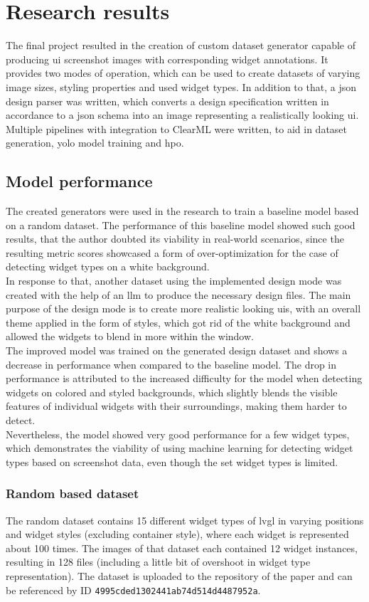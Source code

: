 \documentclass[Bachelor, BIC, english, fhCitStyle, IEEE]{BASE/twbook} %
\def\code#1{\texttt{#1}}
\begin{document}
\chapter{Research results}
The final project resulted in the creation of custom dataset generator capable of producing \ac{ui} screenshot images with corresponding widget annotations. It provides two modes of operation, which can be used to create datasets of varying image sizes, styling properties and used widget types.
In addition to that, a \ac{json} design parser was written, which converts a design specification written in accordance to a \ac{json} schema into an image representing a realistically looking \ac{ui}.\\
Multiple pipelines with integration to ClearML were written, to aid in dataset generation, \ac{yolo} model training and \acf{hpo}.
\section{Model performance}
The created generators were used in the research to train a baseline model based on a random dataset. The performance of this baseline model showed such good results, that the author doubted its viability in real-world scenarios, since the resulting metric scores showcased a form of over-optimization for the case of detecting widget types on a white background.\\
In response to that, another dataset using the implemented design mode was created with the help of an \ac{llm} to produce the necessary design files. The main purpose of the design mode is to create more realistic looking \acp{ui}, with an overall theme applied in the form of styles, which got rid of the white background and allowed the widgets to blend in more within the window.\\
The improved model was trained on the generated design dataset and shows a decrease in performance when compared to the baseline model. The drop in performance is attributed to the increased difficulty for the model when detecting widgets on colored and styled backgrounds, which slightly blends the visible features of individual widgets with their surroundings, making them harder to detect.\\
Nevertheless, the model showed very good performance for a few widget types, which demonstrates the viability of using machine learning for detecting widget types based on screenshot data, even though the set widget types is limited.
\subsection{Random based dataset}
The random dataset contains 15 different widget types of \ac{lvgl} in varying positions and widget styles (excluding container style), where each widget is represented about 100 times. The images of that dataset each contained 12 widget instances, resulting in 128 files (including a little bit of overshoot in widget type representation). The dataset is uploaded to the repository of the paper and can be referenced by ID \code{4995cded1302441ab74d514d4487952a}.
\end{document}
